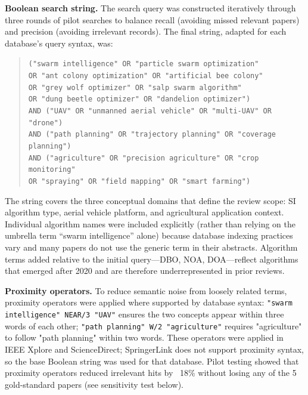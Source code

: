 \documentclass[review,3p,times]{elsarticle}
\begin{document}
\textbf{Boolean search string.} The search query was constructed iteratively through three rounds of pilot searches to balance recall (avoiding missed relevant papers) and precision (avoiding irrelevant records). The final string, adapted for each database's query syntax, was:

\begin{quote}
\small
\texttt{("swarm intelligence" OR "particle swarm optimization"} \\
\texttt{OR "ant colony optimization" OR "artificial bee colony"} \\
\texttt{OR "grey wolf optimizer" OR "salp swarm algorithm"} \\
\texttt{OR "dung beetle optimizer" OR "dandelion optimizer")} \\
\texttt{AND ("UAV" OR "unmanned aerial vehicle" OR "multi-UAV" OR "drone")} \\
\texttt{AND ("path planning" OR "trajectory planning" OR "coverage planning")} \\
\texttt{AND ("agriculture" OR "precision agriculture" OR "crop monitoring"} \\
\texttt{OR "spraying" OR "field mapping" OR "smart farming")}
\end{quote}

The string covers the three conceptual domains that define the review scope: SI algorithm type, aerial vehicle platform, and agricultural application context. Individual algorithm names were included explicitly (rather than relying on the umbrella term ``swarm intelligence'' alone) because database indexing practices vary and many papers do not use the generic term in their abstracts. Algorithm terms added relative to the initial query---DBO, NOA, DOA---reflect algorithms that emerged after 2020 and are therefore underrepresented in prior reviews.

\textbf{Proximity operators.} To reduce semantic noise from loosely related terms, proximity operators were applied where supported by database syntax: \texttt{"swarm intelligence" NEAR/3 "UAV"} ensures the two concepts appear within three words of each other; \texttt{"path planning" W/2 "agriculture"} requires "agriculture" to follow "path planning" within two words. These operators were applied in IEEE Xplore and ScienceDirect; SpringerLink does not support proximity syntax, so the base Boolean string was used for that database. Pilot testing showed that proximity operators reduced irrelevant hits by ~18\% without losing any of the 5 gold-standard papers (see sensitivity test below).
\end{document}
